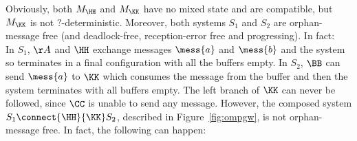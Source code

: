 {%
%
%
%
Obviously, both $M_\HH$ and $M_\KK$
 have no mixed state and are compatible, but %
 $M_\KK$ is not $?$-deterministic.
 Moreover, both systems $S_1$ and $S_2$ are orphan-message free (and deadlock-free, reception-error free and progressing). In fact:\\
 In $S_1$, $\AA$ and $\HH$ exchange messages $\mess{a}$ and $\mess{b}$ and the system so terminates in a final configuration with
 all the buffers empty.
 In $S_2$, $\BB$ can send $\mess{a}$ to $\KK$ which consumes the message from the buffer and then 
 the system terminates with all buffers empty.
 The left branch of $\KK$ can never be followed,
since $\CC$ is unable to send any message. %
However, the composed system $S_1\connect{\HH}{\KK}S_2$, described in  Figure~\ref{fig:ompgw},  is not
 orphan-message free. In fact, the following can happen:
 
}

